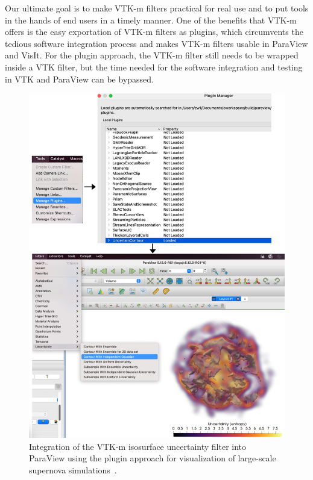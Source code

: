Our ultimate goal is to make VTK-m filters practical for real use and to put tools in the hands of end users in a timely manner. One of the benefits that VTK-m offers is the easy exportation of VTK-m filters as plugins, which circumvents the tedious software integration process and makes VTK-m filters usable in ParaView and VisIt. For the plugin approach, the VTK-m filter still needs to be wrapped inside a VTK filter, but the time needed for the software integration and testing in VTK and ParaView can be bypassed.       

\begin{figure}[htb]
  \includegraphics[width=\linewidth]{figures/isosurfaceUncertaintyPlugin.png}
  \caption{Integration of the VTK-m isosurface uncertainty filter into ParaView using the plugin approach for visualization of large-scale supernova simulations~\cite{Sandoval_2021}.}
  \label{fig:uncertainty-plugin}
\end{figure}

